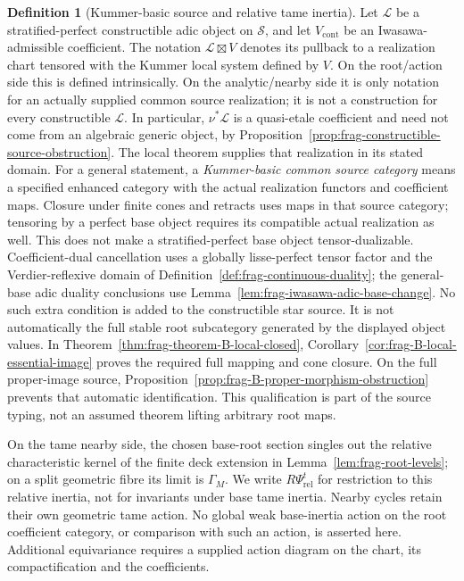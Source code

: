 \documentclass[11pt]{article}
\theoremstyle{definition}
\newtheorem{definition}[theorem]{Definition}
\theoremstyle{remark}
\begin{document}
\begin{definition}[Kummer-basic source and relative tame inertia]
\label{def:frag-kummer-basic-source}
Let $\mathcal L$ be a stratified-perfect constructible adic object
on $\mathscr S$, and
let $V_{\mathrm{cont}}$ be an Iwasawa-admissible coefficient.  The notation
$\mathcal L\boxtimes V$ denotes its pullback to a realization chart tensored
with the Kummer local system defined by $V$.  On the root/action side
this is defined intrinsically.  On the analytic/nearby side it is only
notation for an actually supplied common source realization; it is not
a construction for every constructible $\mathcal L$.  In particular,
$\nu^*\mathcal L$ is a quasi-etale coefficient and need not come from
an algebraic generic object, by
Proposition~\ref{prop:frag-constructible-source-obstruction}.
The local theorem supplies that realization in its stated domain.
For a general statement, a \emph{Kummer-basic common source category}
means a specified enhanced category with the actual realization
functors and coefficient maps.  Closure under finite cones and
retracts uses maps in that source category; tensoring by a perfect
base object requires its compatible actual realization as well.
This does not make a stratified-perfect base object tensor-dualizable.
Coefficient-dual cancellation uses a globally lisse-perfect tensor
factor and the Verdier-reflexive domain of
Definition~\ref{def:frag-continuous-duality}; the general-base adic
duality conclusions use Lemma~\ref{lem:frag-iwasawa-adic-base-change}.
No such extra condition is added to the constructible star source.
It is not automatically the full stable root subcategory generated
by the displayed object values.  In Theorem~\ref{thm:frag-theorem-B-local-closed},
Corollary~\ref{cor:frag-B-local-essential-image} proves the required
full mapping and cone closure.  On the full proper-image source,
Proposition~\ref{prop:frag-B-proper-morphism-obstruction} prevents
that automatic identification.  This qualification is part of the
source typing, not an assumed theorem lifting arbitrary root maps.

On the tame nearby side, the chosen base-root section singles out the
relative characteristic kernel of the finite deck extension in
Lemma~\ref{lem:frag-root-levels}; on a split geometric fibre its limit
is $\Gamma_M$.  We write $R\Psi^t_{\mathrm{rel}}$ for restriction to
this relative inertia, not for invariants under base tame inertia.
Nearby cycles retain their own geometric tame action.  No global
weak base-inertia action on the root coefficient category, or
comparison with such an action, is asserted here.  Additional
equivariance requires a supplied action diagram on the chart, its
compactification and the coefficients.
\end{definition}
\end{document}
